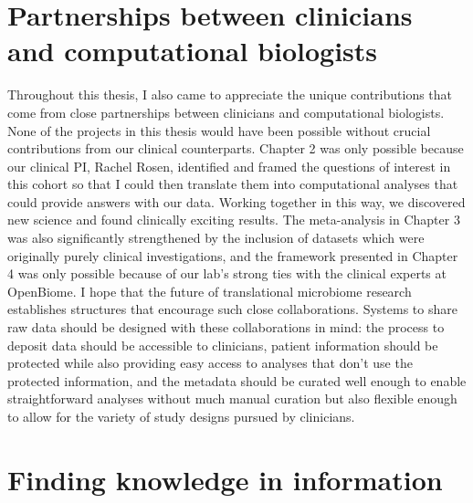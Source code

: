 \section{Partnerships between clinicians and computational biologists}

Throughout this thesis, I also came to appreciate the unique contributions that come from close partnerships between clinicians and computational biologists.
None of the projects in this thesis would have been possible without crucial contributions from our clinical counterparts.
Chapter 2 was only possible because our clinical PI, Rachel Rosen, identified and framed the questions of interest in this cohort so that I could then translate them into computational analyses that could provide answers with our data.
Working together in this way, we discovered new science and found clinically exciting results.
The meta-analysis in Chapter 3 was also significantly strengthened by the inclusion of datasets which were originally purely clinical investigations, and the framework presented in Chapter 4 was only possible because of our lab's strong ties with the clinical experts at OpenBiome.
I hope that the future of translational microbiome research establishes structures that encourage such close collaborations.
Systems to share raw data should be designed with these collaborations in mind: the process to deposit data should be accessible to clinicians, patient information should be protected while also providing easy access to analyses that don't use the protected information, and the metadata should be curated well enough to enable straightforward analyses without much manual curation but also flexible enough to allow for the variety of study designs pursued by clinicians.

\section{Finding knowledge in information}

